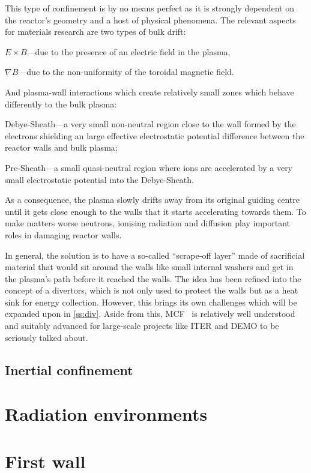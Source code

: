 \documentclass[12pt, a4paper]{article}
\newcommand{\mc}{MCF}
\begin{document}
			This type of confinement is by no means perfect as it is strongly dependent on the reactor's geometry and a host of physical phenomena. The relevant aspects for materials research are two types of bulk drift:
			\begin{inparaenum}[\itshape 1)]
				\item $E \times B$---due to the presence of an electric field in the plasma,
				\item $\nabla B$---due to the non-uniformity of the toroidal magnetic field.
			\end{inparaenum}
			And plasma-wall interactions which create relatively small zones which behave differently to the bulk plasma:
			\begin{inparaenum}[\itshape 1)]
				\item Debye-Sheath---a very small non-neutral region close to the wall formed by the electrons shielding an large effective electrostatic potential difference between the reactor walls and bulk plasma;
				\item Pre-Sheath---a small quasi-neutral region where ions are accelerated by a very small electrostatic potential into the Debye-Sheath.
			\end{inparaenum}
			As a consequence, the plasma slowly drifts away from its original guiding centre until it gets close enough to the walls that it starts accelerating towards them. To make matters worse neutrons, ionising radiation and diffusion play important roles in damaging reactor walls.
			
			In general, the solution is to have a so-called ``scrape-off layer'' made of sacrificial material that would sit around the walls like small internal washers and get in the plasma's path before it reached the walls. The idea has been refined into the concept of a divertors, which is not only used to protect the walls but as a heat sink for energy collection. However, this brings its own challenges which will be expanded upon in \cref{ss:div}. Aside from this, \mc~ is relatively well understood and suitably advanced for large-scale projects like ITER and DEMO to be seriously talked about.
		\subsection{Inertial confinement}
	\section{Radiation environments}
	\section{First wall}
\end{document}
